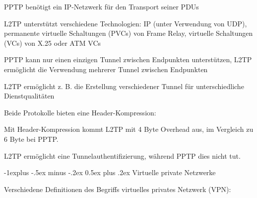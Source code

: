 \documentclass[a4paper]{article}
\makeatletter
\renewcommand{\subsection}{\@startsection{subsection}{2}{0mm}%
 {-1explus -.5ex minus -.2ex}%
 {0.5ex plus .2ex}%
 {\normalfont\normalsize\bfseries}}
\makeatother
\begin{document}
\begin{multicols}{3}
\begin{itemize*}
            \begin{itemize*}
                  \item PPTP benötigt ein IP-Netzwerk für den Transport seiner PDUs
                  \item L2TP unterstützt verschiedene Technologien: IP (unter Verwendung von UDP), permanente virtuelle Schaltungen (PVCs) von Frame Relay, virtuelle Schaltungen (VCs) von X.25 oder ATM VCs
            \end{itemize*}
            \item
            PPTP kann nur einen einzigen Tunnel zwischen Endpunkten unterstützen,
            L2TP ermöglicht die Verwendung mehrerer Tunnel zwischen Endpunkten

            \begin{itemize*}
                  \item L2TP ermöglicht z. B. die Erstellung verschiedener Tunnel für unterschiedliche Dienstqualitäten
            \end{itemize*}
            \item
            Beide Protokolle bieten eine Header-Kompression:

            \begin{itemize*}
                  \item Mit Header-Kompression kommt L2TP mit 4 Byte Overhead aus, im Vergleich zu 6 Byte bei PPTP.
            \end{itemize*}
            \item
            L2TP ermöglicht eine Tunnelauthentifizierung, während PPTP dies nicht
            tut.
      \end{itemize*}


      \subsection{Virtuelle private
            Netzwerke}

      \begin{itemize*}
            \item
            Verschiedene Definitionen des Begriffs virtuelles privates Netzwerk
            (VPN):


\end{itemize*}
\end{multicols}
\end{document}
